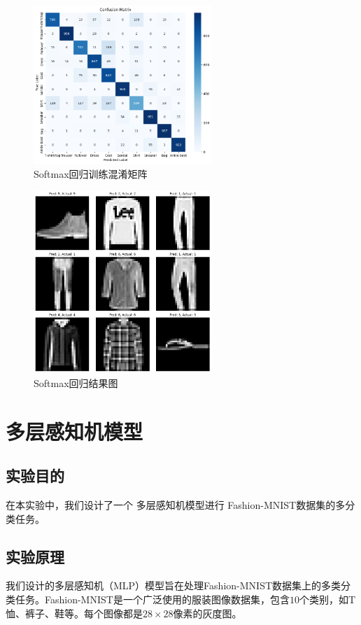 \documentclass[a4paper,12pt]{article}
\begin{document}
\begin{figure}[htbp]
	\centering
	\includegraphics[width=0.6\textwidth]{3.png}
	\caption{Softmax回归训练混淆矩阵}
\end{figure}

\begin{figure}[htbp]
	\centering
	\includegraphics[width=0.6\textwidth]{4.png}
	\caption{Softmax回归结果图}
\end{figure}



\section{多层感知机模型}
\subsection{实验目的}
在本实验中，我们设计了一个 多层感知机模型进行 Fashion-MNIST数据集的多分类任务。

\subsection{实验原理}
我们设计的多层感知机（MLP）模型旨在处理Fashion-MNIST数据集上的多类分类任务。Fashion-MNIST是一个广泛使用的服装图像数据集，包含$10$个类别，如T恤、裤子、鞋等。每个图像都是$28 \times 28$像素的灰度图。
\end{document}
